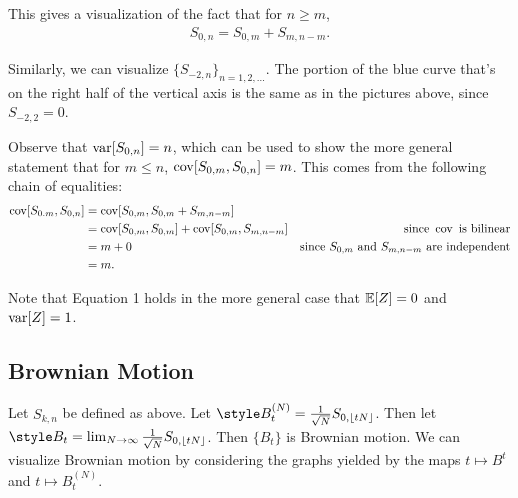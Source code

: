 \documentclass[../../../Master/AppliedStochastics.tex]{subfiles}
\begin{document}
This gives a visualization of the fact that for $n\geq m$, 
$$\begin{aligned}
    S_{0,n}=S_{0,m}+S_{m,n-m}.
\end{aligned}$$

Similarly, we can visualize $\{S_{-2,n}\}_{n=1,2,\dots}$.  
The portion of the blue curve that's on the right half of the vertical axis is the same as in the pictures above, since $S_{-2,2}=0$.

\begin{center}
\end{center}

Observe that $\operatorname{var}[S_{0,n}]=n$, which can be used to show the more general statement that for $m\leq n$, $\operatorname{cov}[S_{0,m},S_{0,n}]=m$.  
This comes from the following chain of equalities:
$$\begin{aligned}
\operatorname{cov}[S_{0.m},S_{0,n}]&=\operatorname{cov}[S_{0,m},S_{0,m}+S_{m,n-m}]\\
    &=\operatorname{cov}[S_{0,m},S_{0,m}]+\operatorname{cov}[S_{0,m},S_{m,n-m}]&\text{since }\operatorname{cov}\text{ is bilinear}\\
    &=m+0&\text{since }S_{0,m}\text{ and }S_{m,n-m}\text{ are independent}\\
    &=m.
\end{aligned}$$

Note that Equation 1 holds in the more general case that $\mathbb{E}[Z]=0$ and $\operatorname{var}[Z]=1$.

\subsection{Brownian Motion}

Let $S_{k,n}$ be defined as above.  
Let $\style B_t^{(N)}=\frac{1}{\sqrt{N}}S_{0,\lfloor tN\rfloor}$.  
Then let $\style B_t=\lim_{N\to\infty}\frac{1}{\sqrt{N}}S_{0,\lfloor tN\rfloor}$.  
Then $\{B_t\}$ is Brownian motion.  
We can visualize Brownian motion by considering the graphs yielded by the maps $t\mapsto B^t$ and $t\mapsto B_t^{(N)}$.
\end{document}
